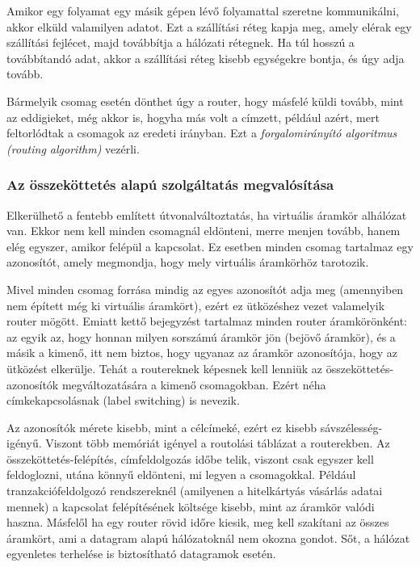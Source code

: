 \documentclass[fleqn,10pt,a4paper]{article}
\theoremstyle{magyar}
\begin{document}
  Amikor egy folyamat egy másik gépen lévő folyamattal szeretne kommunikálni, akkor elküld valamilyen adatot. Ezt a
  szállítási réteg kapja meg, amely elérak egy szállítási fejlécet, majd továbbítja a hálózati rétegnek. Ha túl hosszú a
  továbbítandó adat, akkor a szállítási réteg kisebb egységekre bontja, és úgy adja tovább.

  Bármelyik csomag esetén dönthet úgy a router, hogy másfelé küldi tovább, mint az eddigieket, még akkor is, hogyha más
  volt a címzett, például azért, mert feltorlódtak a csomagok az eredeti irányban. Ezt a \emph{forgalomirányító algoritmus
    (routing algorithm)} vezérli.

  \subsubsection{Az összeköttetés alapú szolgáltatás megvalósítása}
  Elkerülhető a fentebb említett útvonalváltoztatás, ha virtuális áramkör alhálózat van. Ekkor nem kell minden csomagnál
  eldönteni, merre menjen tovább, hanem elég egyszer, amikor felépül a kapcsolat. Ez esetben minden csomag tartalmaz
  egy azonosítót, amely megmondja, hogy mely virtuális áramkörhöz tarotozik.

  Mivel minden csomag forrása mindig az egyes azonosítót adja meg (amennyiben nem épített még ki virtuális áramkört),
  ezért ez ütközéshez vezet valamelyik router mögött. Emiatt kettő bejegyzést tartalmaz minden router áramkörönként: az
  egyik az, hogy honnan milyen sorszámú áramkör jön (bejövő áramkör), és a másik a kimenő, itt nem biztos, hogy ugyanaz
  az áramkör azonosítója, hogy az ütközést elkerülje. Tehát a routereknek képesnek kell lenniük az
  összeköttetés-azonosítók megváltozatására a kimenő csomagokban. Ezért néha címkekapcsolásnak (label switching) is nevezik.

  Az azonosítók mérete kisebb, mint a célcímeké, ezért ez kisebb sávszélesség-igényű. Viszont több memóriát igényel a routolási
  táblázat a routerekben. Az összeköttetés-felépítés, címfeldolgozás időbe telik, viszont csak egyszer kell feldoglozni,
  utána könnyű eldönteni, mi legyen a csomagokkal. Például tranzakciófeldolgozó rendszereknél (amilyenen a hitelkártyás
  vásárlás adatai mennek) a kapcsolat felépítésének költsége kisebb, mint az áramkör valódi haszna. Másfelől ha egy
  router rövid időre kiesik, meg kell szakítani az összes áramkört, ami a datagram alapú hálózatoknál nem okozna
  gondot. Sőt, a hálózat egyenletes terhelése is biztosítható datagramok esetén.
  
\end{document}
